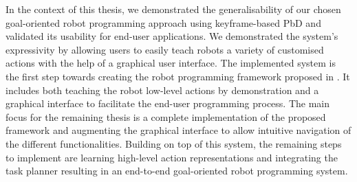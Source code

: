 In the context of this thesis, we demonstrated the generalisability of our chosen goal-oriented robot programming approach using keyframe-based PbD and validated its usability for end-user applications.
We demonstrated the system's expressivity by allowing users to easily teach robots a variety of customised actions with the help of a graphical user interface.
The implemented system is the first step towards creating the robot programming framework proposed in .
It includes both teaching the robot low-level actions by demonstration and a graphical interface to facilitate the end-user programming process.
The main focus for the remaining thesis is a complete implementation of the proposed framework and augmenting the graphical interface to allow intuitive navigation of the different functionalities. 
Building on top of this system, the remaining steps to implement are learning high-level action representations and integrating the task planner resulting in an end-to-end goal-oriented robot programming system.